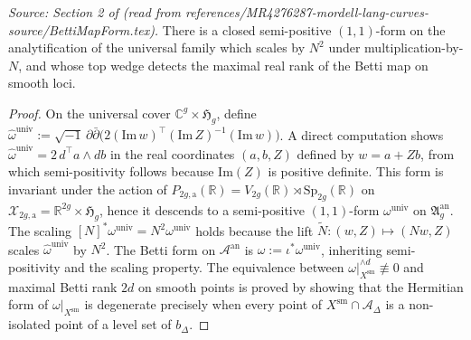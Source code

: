 \begin{proposition}
  \label{prop:betti_form}
  \textit{Source: Section 2 of \cite{MR4276287-mordell-lang-curves} (read from references/MR4276287-mordell-lang-curves-source/BettiMapForm.tex).}
  There is a closed semi-positive \((1,1)\)-form on the analytification of the
  universal family which scales by \(N^2\) under multiplication-by-\(N\), and
  whose top wedge detects the maximal real rank of the Betti map on smooth
  loci.
\end{proposition}

\begin{proof}
  On the universal cover \(\mathbb{C}^g \times \mathfrak{H}_g\), define
  \(\hat{\omega}^{\mathrm{univ}} := \sqrt{-1}\,\partial\bar{\partial}
  \bigl(2(\mathrm{Im}\,w)^\intercal (\mathrm{Im}\,Z)^{-1}(\mathrm{Im}\,w)\bigr)\).
  A direct computation shows
  \(\hat{\omega}^{\mathrm{univ}} = 2\,d^\intercal a \wedge db\)
  in the real coordinates \((a,b,Z)\) defined by \(w = a + Zb\),
  from which semi-positivity follows because \(\mathrm{Im}(Z)\) is positive definite.
  This form is invariant under the action of \(P_{2g,\mathrm{a}}(\mathbb{R}) = V_{2g}(\mathbb{R}) \rtimes \mathrm{Sp}_{2g}(\mathbb{R})\)
  on \(\mathcal{X}_{2g,\mathrm{a}} = \mathbb{R}^{2g} \times \mathfrak{H}_g\),
  hence it descends to a semi-positive \((1,1)\)-form \(\omega^{\mathrm{univ}}\) on
  \(\mathfrak{A}_g^{\mathrm{an}}\).
  The scaling \([N]^*\omega^{\mathrm{univ}} = N^2\omega^{\mathrm{univ}}\) holds because
  the lift \(\widetilde{N} \colon (w,Z) \mapsto (Nw, Z)\) scales \(\hat{\omega}^{\mathrm{univ}}\)
  by \(N^2\).
  The Betti form on \(\mathcal{A}^{\mathrm{an}}\) is \(\omega := \iota^*\omega^{\mathrm{univ}}\),
  inheriting semi-positivity and the scaling property.
  The equivalence between \(\omega|_{X^{\mathrm{sm}}}^{\wedge d} \not\equiv 0\)
  and maximal Betti rank \(2d\) on smooth points is proved by showing that the
  Hermitian form of \(\omega|_{X^{\mathrm{sm}}}\) is degenerate precisely when
  every point of \(X^{\mathrm{sm}} \cap \mathcal{A}_\Delta\) is a non-isolated point of
  a level set of \(b_\Delta\).
\end{proof}

